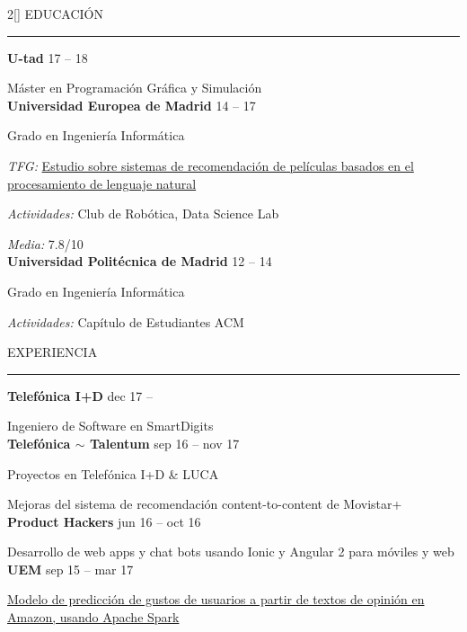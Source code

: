 \documentclass[a4paper, 12pt]{article}
\newenvironment{myparacol}[2][]{%
\begin{paracol}{#2}[#1]\setlength{\parindent}{0pt}}{%
\end{paracol}}
\begin{document}
\setlength{\columnsep}{24pt}
\begin{sloppypar}
\begin{myparacol}{2}
    EDUCACIÓN
    \vspace{1mm}
    \hrule
    \kern9pt
    \textbf{U-tad} \hfill 17 -- 18

    Máster en Programación Gráfica y Simulación\\

    \textbf{Universidad Europea de Madrid} \hfill 14 -- 17

    Grado en Ingeniería Informática

    \textit{TFG:} \href{https://github.com/hugo19941994/movie-pepper-doc/raw/master/thesis.pdf}{Estudio sobre sistemas de recomendación de películas basados en el procesamiento de lenguaje natural}

    \textit{Actividades:} Club de Robótica, Data Science Lab

    \textit{Media:} 7.8/10\\

    \textbf{Universidad Politécnica de Madrid} \hfill 12 -- 14

    Grado en Ingeniería Informática

    \textit{Actividades:} Capítulo de Estudiantes ACM
    \\

    \switchcolumn

    EXPERIENCIA
    \vspace{1mm}
    \hrule
    \kern9pt

    \textbf{Telefónica I+D} \hfill dec 17 --

    Ingeniero de Software en SmartDigits\\

    \textbf{Telefónica $\sim$ Talentum} \hfill sep 16 -- nov 17

    Proyectos en Telefónica I+D \& LUCA

    Mejoras del sistema de recomendación content-to-content de Movistar+\\

    \textbf{Product Hackers} \hfill jun 16 -- oct 16

    Desarrollo de web apps y chat bots usando Ionic y Angular 2 para móviles y web\\

    \textbf{UEM} \hfill sep 15 -- mar 17

    \href{https://www.researchgate.net/publication/314142014_Prediction_of_User_Opinion_for_Products_-_A_Bag-of-Words_and_Collaborative_Filtering_based_Approach}{Modelo de predicción de gustos de usuarios a partir de textos de opinión en Amazon, usando Apache Spark}


\end{myparacol}
\end{sloppypar}
\end{document}
